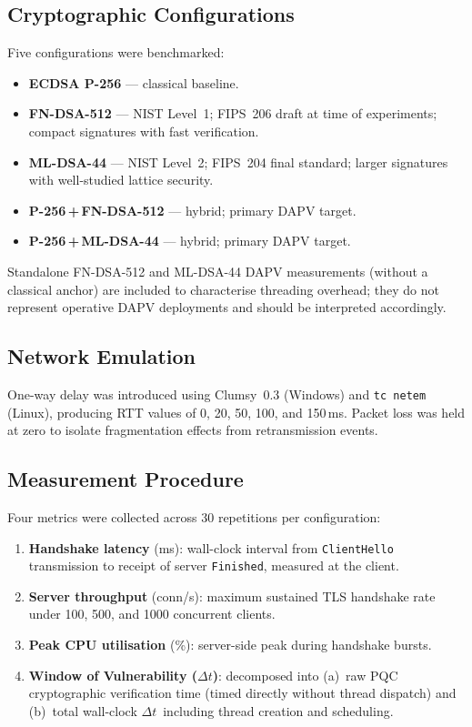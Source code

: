 \documentclass[preprint,10pt,3p]{elsarticle}
\newcommand{\Dt}{\ensuremath{\Delta t}}
\newcommand{\ms}{\,ms}
\begin{document}
\subsection{Cryptographic Configurations}

Five configurations were benchmarked:
\begin{itemize}[noitemsep]
  \item \textbf{ECDSA P-256} --- classical baseline.
  \item \textbf{FN-DSA-512} --- NIST Level~1; FIPS~206 draft at time of
        experiments; compact signatures with fast verification.
  \item \textbf{ML-DSA-44} --- NIST Level~2; FIPS~204 final standard; larger
        signatures with well-studied lattice security.
  \item \textbf{P-256\,+\,FN-DSA-512} --- hybrid; primary DAPV target.
  \item \textbf{P-256\,+\,ML-DSA-44} --- hybrid; primary DAPV target.
\end{itemize}

\noindent Standalone FN-DSA-512 and ML-DSA-44 DAPV measurements (without a
classical anchor) are included to characterise threading overhead; they do not
represent operative DAPV deployments and should be interpreted accordingly.

\subsection{Network Emulation}

One-way delay was introduced using Clumsy~0.3 (Windows) and \texttt{tc netem}
(Linux), producing RTT values of 0, 20, 50, 100, and 150\ms.  Packet loss was
held at zero to isolate fragmentation effects from retransmission events.

\subsection{Measurement Procedure}

Four metrics were collected across 30 repetitions per configuration:

\begin{enumerate}[noitemsep]
\item \textbf{Handshake latency} (ms): wall-clock interval from
  \texttt{ClientHello} transmission to receipt of server \texttt{Finished},
  measured at the client.

\item \textbf{Server throughput} (conn/s): maximum sustained TLS handshake
  rate under 100, 500, and 1000 concurrent clients.

\item \textbf{Peak CPU utilisation} (\%): server-side peak during handshake
  bursts.

\item \textbf{Window of Vulnerability (\Dt)}: decomposed into (a)~raw PQC
  cryptographic verification time (timed directly without thread dispatch) and
  (b)~total wall-clock \Dt\ including thread creation and scheduling.
\end{enumerate}
\end{document}
